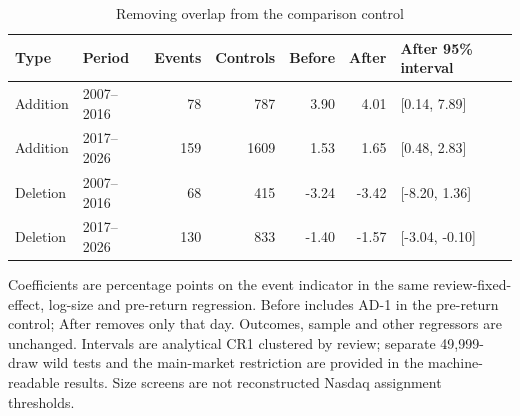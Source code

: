 \begin{table}[!htbp]
\centering
\caption{Removing overlap from the comparison control}\label{tab:comparators_repaired}
\small
\setlength{\tabcolsep}{5pt}
\begin{tabular}{llrrrrl}
\toprule
Type & Period & Events & Controls & Before & After & After 95\% interval \\
\midrule
Addition & 2007--2016 & 78 & 787 & 3.90 & 4.01 & [0.14, 7.89] \\
Addition & 2017--2026 & 159 & 1609 & 1.53 & 1.65 & [0.48, 2.83] \\
Deletion & 2007--2016 & 68 & 415 & -3.24 & -3.42 & [-8.20, 1.36] \\
Deletion & 2017--2026 & 130 & 833 & -1.40 & -1.57 & [-3.04, -0.10] \\
\bottomrule
\end{tabular}
\begin{minipage}{\linewidth}\footnotesize\vspace{5pt}
Coefficients are percentage points on the event indicator in the same review-fixed-effect, log-size and pre-return regression. Before includes AD-1 in the pre-return control; After removes only that day. Outcomes, sample and other regressors are unchanged. Intervals are analytical CR1 clustered by review; separate 49,999-draw wild tests and the main-market restriction are provided in the machine-readable results. Size screens are not reconstructed Nasdaq assignment thresholds.
\end{minipage}
\end{table}
